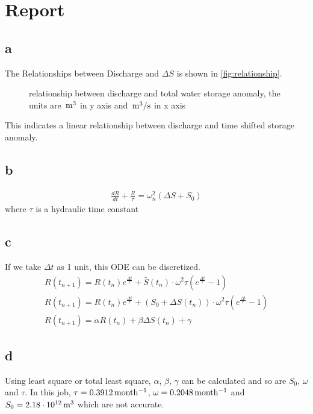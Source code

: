 \chapter{Report}
\section{a}
The Relationships between Discharge and $\Delta S$ is shown in \autoref{fig:relationship}.
\begin{figure}[htpb]\centering
	\caption{relationship between discharge and total water storage anomaly, the units are $\,\mathrm{m^3}$ in y axis and $\,\mathrm{m^3/s}$ in x axis}
	\label{fig:relationship}
\end{figure}
This indicates a linear relationship between discharge and time shifted storage anomaly. 
\section{b}
\begin{gather*}
	\frac{dR}{dt} + \frac{R}{\tau} = \omega^2_n (\Delta S + S_{0})
\end{gather*}
where $\tau$ is a hydraulic time constant
\section{c}
If we take $\Delta t$ as 1 unit, this ODE can be discretized.
\begin{gather*}
	R(t_{n+1}) = R(t_{n}) e^{\frac{\Delta t}{\tau}} + \bar{S}(t_{n}) \cdot \omega^2 \tau (e^{\frac{\Delta t}{\tau}} - 1) \\
	R(t_{n+1}) = R(t_{n}) e^{\frac{\Delta t}{\tau}} + \left(S_0 + \Delta S(t_{n})\right) \cdot \omega^2 \tau (e^{\frac{\Delta t}{\tau}} - 1) \\
	R(t_{n+1}) = \alpha R(t_{n}) + \beta  \Delta S(t_{n}) + \gamma
\end{gather*}
\section{d}
Using least square or total least square, $\alpha$, $\beta$, $\gamma$ can be calculated and so are $S_0$, $\omega$ and $\tau$. In this job, $\tau=0.3912 \,\mathrm{month^{-1}}$, $\omega = 0.2048 \,\mathrm{month^{-1}}$ and $S_0=2.18 \cdot 10^{12}\,\mathrm{m^3}$ which are not accurate. 


